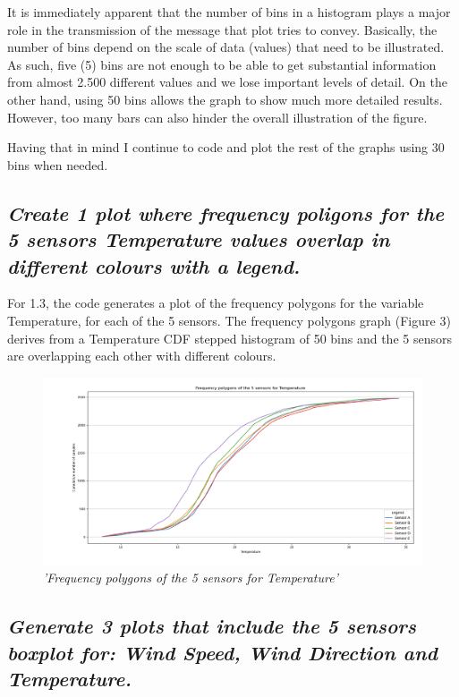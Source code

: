 \documentclass[a4paper,12pt]{article}
\begin{document}
It is immediately apparent that the number of bins in a histogram plays a 
major role in the transmission of the message that plot tries to convey. 
Basically, the number of bins depend on the scale of data (values) 
that need to be illustrated. As such, five (5) bins are not enough 
to be able to get substantial information from almost 2.500 different 
values and we lose important levels of detail. On the other hand, using 
50 bins allows the graph to show much more detailed results. However, too 
many bars can also hinder the overall illustration of the figure.




Having that in mind I continue to code and plot the rest of the graphs using 30 bins when needed.  




\subsection{\it Create 1 plot where frequency poligons for the 5 sensors Temperature values overlap in different colours with a legend.}




For 1.3, the code generates a plot of the frequency polygons for 
the variable Temperature, for each of the 5 sensors. 
The frequency polygons graph (Figure 3) derives from a Temperature CDF 
stepped histogram of 50 bins and the 5 sensors are overlapping each other with 
different colours.



\begin{figure}[H]
\centering
\includegraphics[width=\textwidth]{Graphs/Frequency_polygons_of_Temperature.png}
\caption{\it'Frequency polygons of the 5 sensors for Temperature'}
\end{figure}



\subsection{\it Generate 3 plots that include the 5 sensors boxplot for: Wind Speed, Wind Direction and Temperature.}
\end{document}
